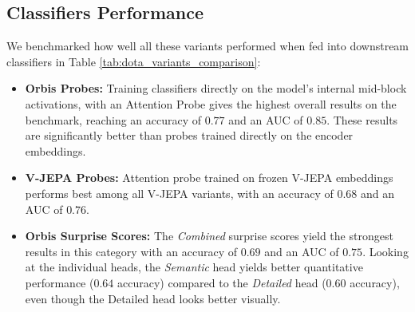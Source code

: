 \documentclass{article}
\begin{document}
\subsection{Classifiers Performance}
We benchmarked how well all these variants performed when fed into downstream classifiers in Table \ref{tab:dota_variants_comparison}:
\begin{itemize}
      \item \textbf{Orbis Probes:} Training classifiers directly on the model's internal mid-block activations, with an Attention Probe gives the highest overall results on the benchmark, reaching an accuracy of $0.77$ and an AUC of $0.85$. These results are significantly better than probes trained directly on the encoder embeddings.
    \item \textbf{V-JEPA Probes:} Attention probe trained on frozen V-JEPA embeddings performs best among all V-JEPA variants, with an accuracy of $0.68$ and an AUC of $0.76$. 
    \item \textbf{Orbis Surprise Scores:} The \textit{Combined} surprise scores yield the strongest results in this category with an accuracy of $0.69$ and an AUC of $0.75$. Looking at the individual heads, the \textit{Semantic} head yields better quantitative performance ($0.64$ accuracy) compared to the \textit{Detailed} head ($0.60$ accuracy), even though the Detailed head looks better visually.


\end{itemize}
\end{document}
